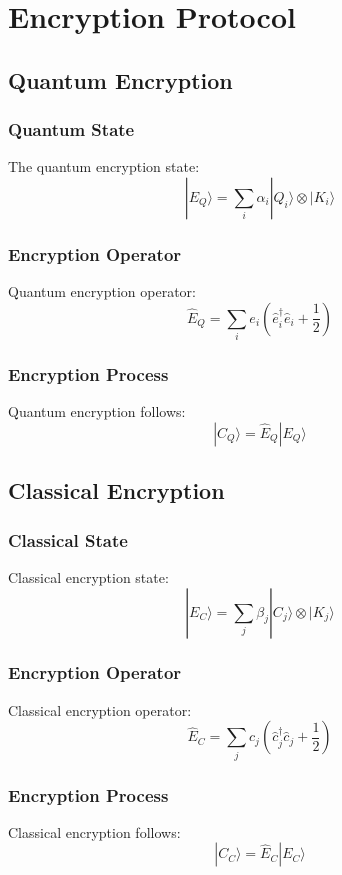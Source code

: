 \documentclass[12pt]{article}
\begin{document}
\section{Encryption Protocol}
\subsection{Quantum Encryption}
\subsubsection{Quantum State}
The quantum encryption state:
\begin{equation}
|E_Q\rangle = \sum_i \alpha_i|Q_i\rangle \otimes |K_i\rangle
\end{equation}
\subsubsection{Encryption Operator}
Quantum encryption operator:
\begin{equation}
\hat{E}_Q = \sum_i e_i(\hat{e}_i^\dagger\hat{e}_i + \frac{1}{2})
\end{equation}
\subsubsection{Encryption Process}
Quantum encryption follows:
\begin{equation}
|C_Q\rangle = \hat{E}_Q|E_Q\rangle
\end{equation}
\subsection{Classical Encryption}
\subsubsection{Classical State}
Classical encryption state:
\begin{equation}
|E_C\rangle = \sum_j \beta_j|C_j\rangle \otimes |K_j\rangle
\end{equation}
\subsubsection{Encryption Operator}
Classical encryption operator:
\begin{equation}
\hat{E}_C = \sum_j c_j(\hat{c}_j^\dagger\hat{c}_j + \frac{1}{2})
\end{equation}
\subsubsection{Encryption Process}
Classical encryption follows:
\begin{equation}
|C_C\rangle = \hat{E}_C|E_C\rangle
\end{equation}
\end{document}
